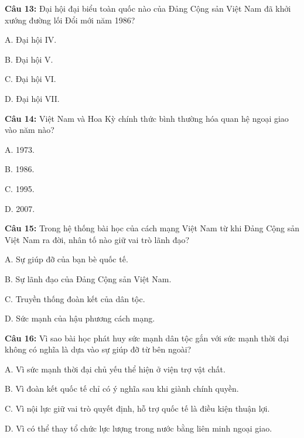 \documentclass[12pt,a4paper]{article}
\begin{document}
\par\noindent\begin{minipage}{\linewidth}
\noindent\textbf{Câu 13:} Đại hội đại biểu toàn quốc nào của Đảng Cộng sản Việt Nam đã khởi xướng đường lối Đổi mới năm 1986?\par
\noindent A. Đại hội IV.\par
\noindent B. Đại hội V.\par
\noindent C. Đại hội VI.\par
\noindent D. Đại hội VII.\par
\end{minipage}\par\vspace{0.12cm}

\par\noindent\begin{minipage}{\linewidth}
\noindent\textbf{Câu 14:} Việt Nam và Hoa Kỳ chính thức bình thường hóa quan hệ ngoại giao vào năm nào?\par
\noindent A. 1973.\par
\noindent B. 1986.\par
\noindent C. 1995.\par
\noindent D. 2007.\par
\end{minipage}\par\vspace{0.12cm}

\par\noindent\begin{minipage}{\linewidth}
\noindent\textbf{Câu 15:} Trong hệ thống bài học của cách mạng Việt Nam từ khi Đảng Cộng sản Việt Nam ra đời, nhân tố nào giữ vai trò lãnh đạo?\par
\noindent A. Sự giúp đỡ của bạn bè quốc tế.\par
\noindent B. Sự lãnh đạo của Đảng Cộng sản Việt Nam.\par
\noindent C. Truyền thống đoàn kết của dân tộc.\par
\noindent D. Sức mạnh của hậu phương cách mạng.\par
\end{minipage}\par\vspace{0.12cm}

\par\noindent\begin{minipage}{\linewidth}
\noindent\textbf{Câu 16:} Vì sao bài học phát huy sức mạnh dân tộc gắn với sức mạnh thời đại không có nghĩa là dựa vào sự giúp đỡ từ bên ngoài?\par
\noindent A. Vì sức mạnh thời đại chủ yếu thể hiện ở viện trợ vật chất.\par
\noindent B. Vì đoàn kết quốc tế chỉ có ý nghĩa sau khi giành chính quyền.\par
\noindent C. Vì nội lực giữ vai trò quyết định, hỗ trợ quốc tế là điều kiện thuận lợi.\par
\noindent D. Vì có thể thay tổ chức lực lượng trong nước bằng liên minh ngoại giao.\par
\end{minipage}\par\vspace{0.12cm}
\end{document}
